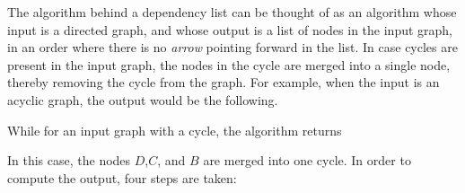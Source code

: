 \documentclass[12pt]{article}
\begin{document}
The algorithm behind a dependency list can be thought of as an algorithm whose
input is a directed graph, and whose output is a list of nodes in the input
graph, in an order where there is no \emph{arrow} pointing forward in the list.
In case cycles are present in the input graph, the nodes in the cycle are
merged into a single node, thereby removing the cycle from the graph. For
example, when the input is an acyclic graph, the output would be the following. 
\begin{center}
\end{center}
While for an input graph with a cycle, the algorithm returns
\begin{center}
\end{center}
In this case, the nodes $D$,$C$, and $B$ are merged into one cycle. In order to
compute the output, four steps are taken:
\end{document}
